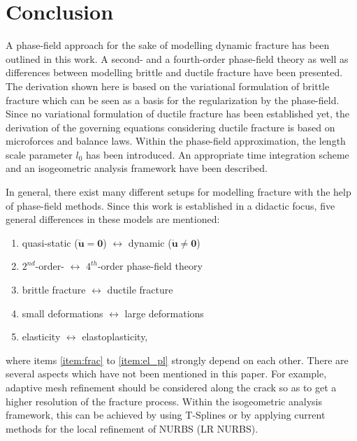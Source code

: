 \section{Conclusion} \label{sec:concl}
A phase-field approach for the sake of modelling dynamic fracture has been outlined in this work. A second- and a fourth-order phase-field theory as well as differences between modelling brittle and ductile fracture have been presented. The derivation shown here is based on the variational formulation of brittle fracture which can be seen as a basis for the regularization by the phase-field. Since no variational formulation of ductile fracture has been established yet, the derivation of the governing equations considering ductile fracture is based on microforces and balance laws.  Within the phase-field approximation, the length scale parameter $l_{0}$ has been introduced. An appropriate time integration scheme and an isogeometric analysis framework have been described.

In general, there exist many different setups for modelling fracture with the help of phase-field methods. Since this work is established in a didactic focus, five general differences in these models are mentioned:
\begin{enumerate}
	\item quasi-static ($\ddot{\mathbf{u}}=\mathbf{0}$) $\leftrightarrow$  dynamic ($\ddot{\mathbf{u}}\neq\mathbf{0}$)
	\item $2^{nd}$-order- $\leftrightarrow$ $4^{th}$-order phase-field theory
	\item\label{item:frac} brittle fracture $\leftrightarrow$ ductile fracture
	\item small deformations $\leftrightarrow$ large deformations
	\item\label{item:el_pl} elasticity $\leftrightarrow$ elastoplasticity,
\end{enumerate}
where items \ref{item:frac} to \ref{item:el_pl} strongly depend on each other. There are several aspects which have not been mentioned in this paper. For example, adaptive mesh refinement should be considered along the crack so as to get a higher resolution of the fracture process. Within the isogeometric analysis framework, this can be achieved by using T-Splines or by applying current methods for the local refinement of NURBS (LR NURBS).

